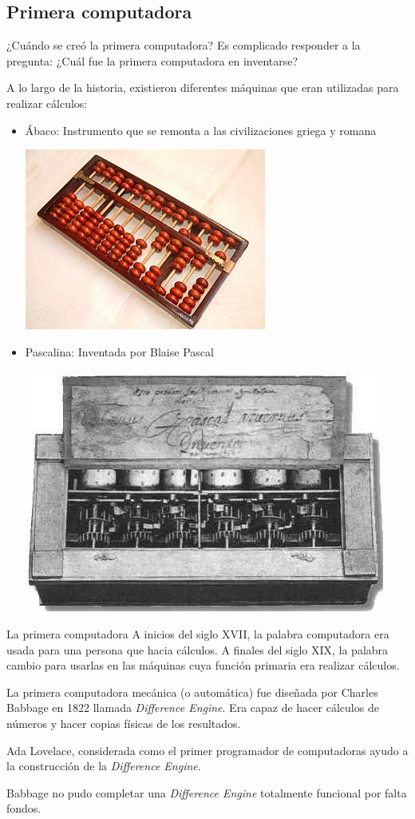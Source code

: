 \documentclass[11pt]{beamer}
\begin{document}
\subsection{Primera computadora}
\begin{frame}{¿Cuándo se creó la primera computadora?}
	Es complicado responder a la pregunta: ¿Cuál fue la primera computadora en inventarse?
	
	A lo largo de la historia, existieron diferentes máquinas que eran utilizadas para realizar cálculos:
	\begin{itemize}
		\item Ábaco: Instrumento que se remonta a las civilizaciones griega y romana
		
		\includegraphics[scale=.25]{abaco.jpg}
		\item Pascalina: Inventada por Blaise Pascal 
		
		\includegraphics[scale=.15]{pascalina.jpg}
	\end{itemize}
\end{frame}
\begin{frame}{La primera computadora}
	A inicios del siglo XVII, la palabra computadora era usada para una persona que hacia cálculos. A finales del siglo XIX, la palabra cambio para usarlas en las máquinas cuya función primaria era realizar cálculos.
	
	La primera computadora mecánica (o automática) fue diseñada por Charles Babbage en 1822 llamada \textit{Difference Engine}. Era capaz de hacer cálculos de números y hacer copias físicas de los resultados.
	
	Ada Lovelace, considerada como el primer programador de computadoras ayudo a la construcción de la \textit{Difference Engine}.
	
	Babbage no pudo completar una \textit{Difference Engine} totalmente funcional por falta fondos. 
\end{frame}
\end{document}
